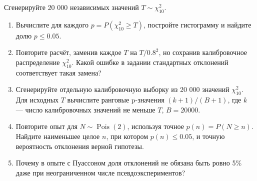 \documentclass[
  russian,
  11pt,
  a4paper,
  open=any]{scrbook}
\providecommand{\tightlist}{%
  \setlength{\itemsep}{0pt}\setlength{\parskip}{0pt}}
\begin{document}
\begin{semanticpdfbox}[colback=BookCoralSoft,borderline west={1.2mm}{0pt}{BookCoral}]

\par\nopagebreak[4]\vspace{1.2mm}

Сгенерируйте 20 000 независимых значений \(T\sim\chi^2_{10}\).

\begin{enumerate}
\def\labelenumi{\arabic{enumi}.}
\tightlist
\item
  Вычислите для каждого \(p=P(\chi^2_{10}\ge T)\), постройте гистограмму
  и найдите долю \(p\le0.05\).
\item
  Повторите расчёт, заменив каждое \(T\) на \(T/0.8^2\), но сохранив
  калибровочное распределение \(\chi^2_{10}\). Какой ошибке в задании
  стандартных отклонений соответствует такая замена?
\item
  Сгенерируйте отдельную калибровочную выборку из 20 000 значений
  \(\chi^2_{10}\). Для исходных \(T\) вычислите ранговые p-значения
  \((k+1)/(B+1)\), где \(k\) --- число калибровочных значений не меньше
  \(T\), \(B=20000\).
\item
  Повторите опыт для \(N\sim\operatorname{Pois}(2)\), используя точное
  \(p(n)=P(N\ge n)\). Найдите наименьшее целое \(n\), при котором
  \(p(n)\le0.05\), и точную вероятность отклонения верной гипотезы.
\item
  Почему в опыте с Пуассоном доля отклонений не обязана быть ровно 5\%
  даже при неограниченном числе псевдоэкспериментов?
\end{enumerate}

\end{semanticpdfbox}
\end{document}
